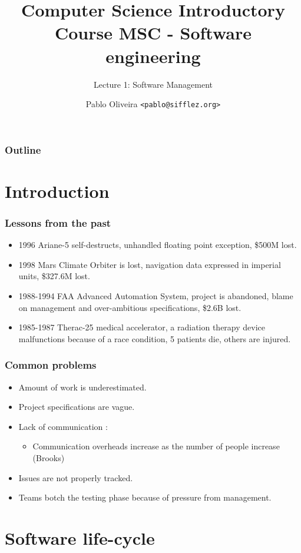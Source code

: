 \documentclass[10pt, handout]{beamer}
\title{Computer Science Introductory Course MSC - Software engineering}
\subtitle{Lecture 1: Software Management}
\author[Pablo Oliveira]{Pablo Oliveira \texttt{<pablo@sifflez.org>}}
\institute{Telecom ParisTech}
\date{}
\begin{document}
\begin{frame}
  \titlepage
\end{frame}

\begin{frame}
  \frametitle{Outline}
  \tableofcontents
\end{frame}

\section{Introduction}
\begin{frame}[fragile]
  \frametitle{Lessons from the past}
  \begin{itemize}
  \item 1996 Ariane-5 self-destructs, unhandled floating point exception,
    \$500M lost.
  \item 1998 Mars Climate Orbiter is lost, navigation data expressed in imperial
    units, \$327.6M lost.
  \item 1988-1994 FAA Advanced Automation System, project is abandoned, blame
    on management and over-ambitious specifications, \$2.6B lost.
  \item 1985-1987 Therac-25 medical accelerator, a radiation therapy device
    malfunctions because of a race condition, 5 patients die, others are injured.
  \end{itemize}
\end{frame}

\begin{frame}[fragile]
  \frametitle{Common problems}
  \begin{itemize}
  \item Amount of work is underestimated.
  \item Project specifications are vague.
  \item Lack of communication :
    \begin{itemize}
    \item Communication overheads increase as the number of people increase
      (Brooks)
    \end{itemize}
  \item Issues are not properly tracked.
  \item Teams botch the testing phase because of pressure from management.
  \end{itemize}
\end{frame}

\section{Software life-cycle}
\end{document}

